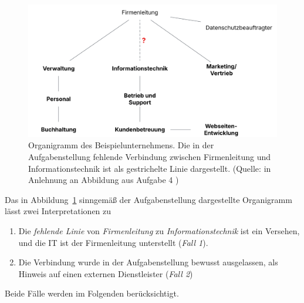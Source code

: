 \begin{figure}
    \centering
    \includegraphics[scale=0.4]{aufgabe 4/img/organigramm.svg}
    \caption{Organigramm des Beispielunternehmens. Die in der Aufgabenstellung fehlende Verbindung zwischen Firmenleitung und Informationstechnik ist als gestrichelte Linie dargestellt. (Quelle: in Anlehnung an Abbildung aus Aufgabe 4 )}
    \label{fig:organigramm}
\end{figure}


\noindent
Das in Abbildung~\ref{fig:organigramm} sinngemäß der Aufgabenstellung dargestellte Organigramm lässt zwei Interpretationen zu
\begin{enumerate}
    \itemsep0.5em
    \item Die \textit{fehlende Linie} von \textit{Firmenleitung} zu \textit{Informationstechnik} ist ein Versehen, und die IT ist der Firmenleitung unterstellt (\textit{Fall 1}).
    \item Die Verbindung wurde in der Aufgabenstellung bewusst ausgelassen, als Hinweis auf einen externen Dienstleister (\textit{Fall 2})
\end{enumerate}

\noindent
Beide Fälle werden im Folgenden berücksichtigt.

